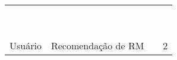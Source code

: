 \begin{table}[htbp]
{\begin{tabular}{|c|l|l|c|}
                              &                                                  & \cite{Lerch:2013:FDY:2495256.2495763}          &                      \\
                              &                                                  & \cite{Liu:2012:TBR:2393596.2393628}            &                      \\
                              &                                                  & \cite{Prifti2011}                              &                      \\
                              &                                                  & \cite{Song2010a}                               &                      \\
                              &                                                  & \cite{sun2010discriminative}                   &                      \\
                              &                                                  & \cite{Sun2011}                                 &                      \\
                              &                                                  & \cite{Thung2014}                               &                      \\
                              &                                                  & \cite{Tian2012}                                &                      \\
                              &                                                  & \cite{Tomasev2013}                             &                      \\ \hline
\multirow{2}{*}{Usuário}      & \multirow{2}{*}{Recomendação de RM}              & \cite{malheiros2012source}                     & \multirow{2}{*}{2}   \\
                              &                                                  & \cite{Wang2011a}                               &                      \\ \hline
\end{tabular}%
}
\end{table}

